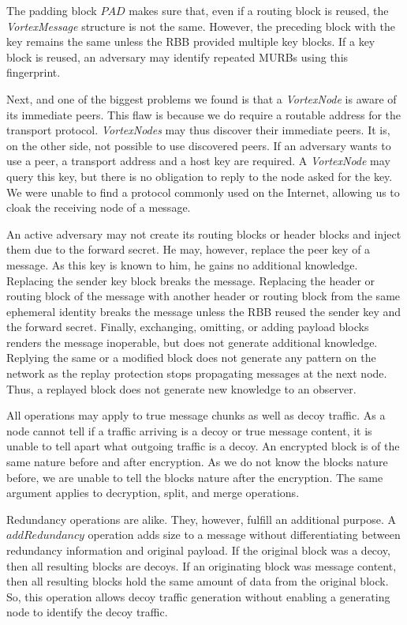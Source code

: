 \documentclass[acmsmall, screen]{acmart}
\begin{document}
The padding block $PAD$ makes sure that, even if a routing block is reused, the \emph{VortexMessage} structure is not the same. However, the preceding block with the key remains the same unless the RBB provided multiple key blocks. If a key block is reused, an adversary may identify repeated MURBs using this fingerprint.


Next, and one of the biggest problems we found is that a \emph{VortexNode} is aware of its immediate peers. This flaw is because we do require a routable address for the transport protocol. \emph{VortexNodes} may thus discover their immediate peers. It is, on the other side, not possible to use discovered peers. If an adversary wants to use a peer, a transport address and a host key are required. A \emph{VortexNode} may query this key, but there is no obligation to reply to the node asked for the key. We were unable to find a protocol commonly used on the Internet, allowing us to cloak the receiving node of a message.

An active adversary may not create its routing blocks or header blocks and inject them due to the forward secret. He may, however, replace the peer key of a message. As this key is known to him, he gains no additional knowledge. Replacing the sender key block breaks the message. Replacing the header or routing block of the message with another header or routing block from the same ephemeral identity breaks the message unless the RBB reused the sender key and the forward secret. Finally, exchanging, omitting, or adding payload blocks renders the message inoperable, but does not generate additional knowledge. Replying the same or a modified block does not generate any pattern on the network as the replay protection stops propagating messages at the next node. Thus, a replayed block does not generate new knowledge to an observer.

All operations may apply to true message chunks as well as decoy traffic. As a node cannot tell if a traffic arriving is a decoy or true message content, it is unable to tell apart what outgoing traffic is a decoy. An encrypted block is of the same nature before and after encryption. As we do not know the blocks nature before, we are unable to tell the blocks nature after the encryption. The same argument applies to decryption, split, and merge operations. 

Redundancy operations are alike. They, however, fulfill an additional purpose. A $addRedundancy$ operation adds size to a message without differentiating between redundancy information and original payload. If the original block was a decoy, then all resulting blocks are decoys. If an originating block was message content, then all resulting blocks hold the same amount of data from the original block. So, this operation allows decoy traffic generation without enabling a generating node to identify the decoy traffic.
\end{document}
